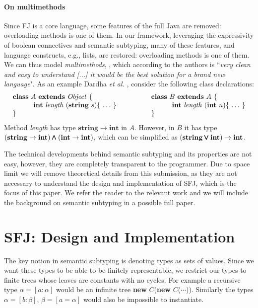 \documentclass[runningheads]{llncs}
\begin{document}
\paragraph{On multimethods}
Since FJ is a core language, some features of the full Java are removed: overloading methods is one of them.
In our framework, leveraging the expressivity of boolean connectives and semantic subtyping, many of these features, and language constructs, e.g., lists, are restored: overloading methods is one of them. We can thus model \emph{multimethods}, \cite{BC97}, which according to the authors is ``\emph{very clean and easy to understand [...] it would be the best solution for a brand new language}".
As an example Dardha \emph{et al.}  \cite{Dardha2013,Dardha2017}, consider the following class declarations:
$$
\begin{array}{ll}
\mathbf{class} \  A \ \mathbf{extends }\  \mathit{Object}\ \{
&
\qquad
\mathbf{class} \  B \ \mathbf{extends }\  A\ \{
\\
	\qquad\quad \mathbf{int}\ \mathit{length}\ (\mathbf{string}\ s)\{\ \ldots\ \}\qquad
&
	\qquad\qquad\quad \mathbf{int}\ \mathit{length}\ (\mathbf{int}\ n)\{\ \ldots\ \}
\\
\}
&
\qquad \}
\end{array}
$$
Method {\it length} has type $\mathbf{string} \rightarrow \mathbf{int}$ in $A$. However, in $B$ it has type $(\mathbf{string} \rightarrow \mathbf{int}) \pmb{\wedge} (\mathbf{int} \rightarrow \mathbf{int})$,
which can be simplified as $(\mathbf{string} \pmb{\vee} \mathbf{int}) \rightarrow \mathbf{int}$.

The technical developments behind semantic subtyping and its properties are not easy, however, they are completely transparent to the programmer.
Due to space limit we will remove theoretical details from this submission, as they are not necessary to understand the design and implementation of SFJ, which is the focus of this paper. We refer the reader to the relevant work \cite{Dardha2013,Dardha2017} and we will include the background on semantic subtyping in a possible full paper.


\section{SFJ: Design and Implementation}
\label{sec:design}
The key notion in semantic subtyping is denoting types as sets of values. 
Since we want these types to be able to be finitely representable, we restrict our types to finite trees whose leaves are constants with no cycles. 
For example a recursive type $\alpha = [a : \alpha]$ would be an infinite tree \textbf{new} $C$(\textbf{new} $C$($\cdots{}$)). 
Similarly the types $\alpha = [b: \beta]$, $\beta = [a = \alpha]$ would also be impossible to instantiate.
\end{document}
